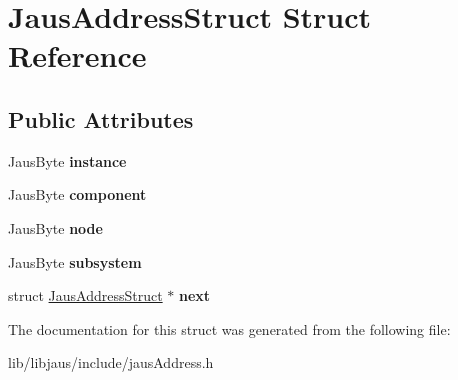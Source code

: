 \hypertarget{struct_jaus_address_struct}{\section{\-Jaus\-Address\-Struct \-Struct \-Reference}
\label{struct_jaus_address_struct}
}
\subsection*{\-Public \-Attributes}
\begin{DoxyCompactItemize}
\item 
\hypertarget{struct_jaus_address_struct_acc9c8dbedc058e7a8ab5e51a69b98ff7}{\-Jaus\-Byte {\bfseries instance}}\label{struct_jaus_address_struct_acc9c8dbedc058e7a8ab5e51a69b98ff7}

\item 
\hypertarget{struct_jaus_address_struct_a02c8cef9598c178f9360337971c0299f}{\-Jaus\-Byte {\bfseries component}}\label{struct_jaus_address_struct_a02c8cef9598c178f9360337971c0299f}

\item 
\hypertarget{struct_jaus_address_struct_a56578985f9c9b0e63861ce07db4a61ed}{\-Jaus\-Byte {\bfseries node}}\label{struct_jaus_address_struct_a56578985f9c9b0e63861ce07db4a61ed}

\item 
\hypertarget{struct_jaus_address_struct_a9f2f42647be47a350dfef361188639ef}{\-Jaus\-Byte {\bfseries subsystem}}\label{struct_jaus_address_struct_a9f2f42647be47a350dfef361188639ef}

\item 
\hypertarget{struct_jaus_address_struct_ae3ca669c9a6e029e5e894591ad943d06}{struct \hyperlink{struct_jaus_address_struct}{\-Jaus\-Address\-Struct} $\ast$ {\bfseries next}}\label{struct_jaus_address_struct_ae3ca669c9a6e029e5e894591ad943d06}

\end{DoxyCompactItemize}


\-The documentation for this struct was generated from the following file\-:\begin{DoxyCompactItemize}
\item 
lib/libjaus/include/jaus\-Address.\-h\end{DoxyCompactItemize}
